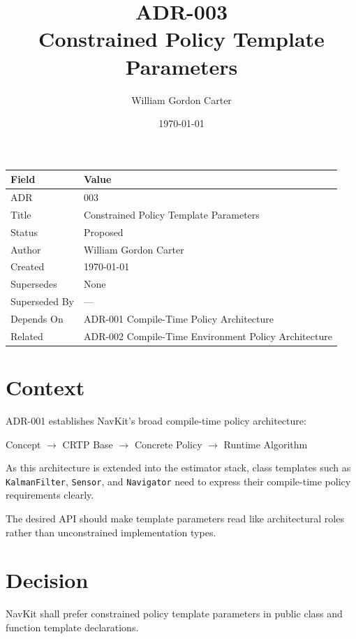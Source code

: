 \documentclass[11pt]{article}
\title{ADR-003\\Constrained Policy Template Parameters}
\author{William Gordon Carter}
\date{\today}
\begin{document}
\maketitle

\begin{center}
\begin{tabular}{ll}
\toprule
\textbf{Field} & \textbf{Value} \\
\midrule
ADR & 003 \\
Title & Constrained Policy Template Parameters \\
Status & Proposed \\
Author & William Gordon Carter \\
Created & \today \\
Supersedes & None \\
Superseded By & --- \\
Depends On & ADR-001 Compile-Time Policy Architecture \\
Related & ADR-002 Compile-Time Environment Policy Architecture \\
\bottomrule
\end{tabular}
\end{center}

\tableofcontents
\newpage

\section{Context}

ADR-001 establishes NavKit's broad compile-time policy architecture:

\begin{center}
Concept $\rightarrow$ CRTP Base $\rightarrow$ Concrete Policy $\rightarrow$ Runtime Algorithm
\end{center}

As this architecture is extended into the estimator stack, class templates such as
\texttt{KalmanFilter}, \texttt{Sensor}, and \texttt{Navigator} need to express
their compile-time policy requirements clearly.

The desired API should make template parameters read like architectural roles
rather than unconstrained implementation types.

\section{Decision}

NavKit shall prefer constrained policy template parameters in public class and
function template declarations.
\end{document}
